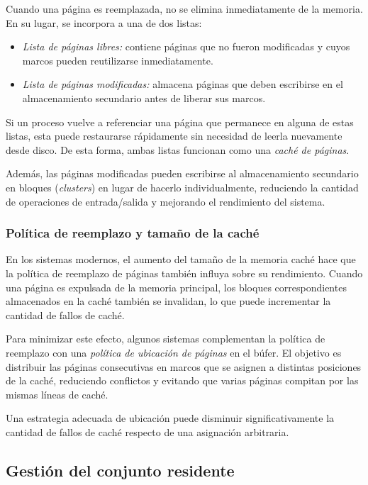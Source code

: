 Cuando una página es reemplazada, no se elimina inmediatamente de la memoria. En su lugar, se incorpora a una de dos listas:

\begin{itemize}
  \item \textit{Lista de páginas libres:} contiene páginas que no fueron modificadas y cuyos marcos pueden reutilizarse inmediatamente.
  \item \textit{Lista de páginas modificadas:} almacena páginas que deben escribirse en el almacenamiento secundario antes de liberar sus marcos.
\end{itemize}

Si un proceso vuelve a referenciar una página que permanece en alguna de estas listas, esta puede restaurarse rápidamente sin necesidad de leerla nuevamente desde disco. De esta forma, ambas listas funcionan como una \textit{caché de páginas}.

Además, las páginas modificadas pueden escribirse al almacenamiento secundario en bloques (\textit{clusters}) en lugar de hacerlo individualmente, reduciendo la cantidad de operaciones de entrada/salida y mejorando el rendimiento del sistema.

\subsubsection{Política de reemplazo y tamaño de la caché}

En los sistemas modernos, el aumento del tamaño de la memoria caché hace que la política de reemplazo de páginas también influya sobre su rendimiento. Cuando una página es expulsada de la memoria principal, los bloques correspondientes almacenados en la caché también se invalidan, lo que puede incrementar la cantidad de fallos de caché.

Para minimizar este efecto, algunos sistemas complementan la política de reemplazo con una \textit{política de ubicación de páginas} en el búfer. El objetivo es distribuir las páginas consecutivas en marcos que se asignen a distintas posiciones de la caché, reduciendo conflictos y evitando que varias páginas compitan por las mismas líneas de caché.

Una estrategia adecuada de ubicación puede disminuir significativamente la cantidad de fallos de caché respecto de una asignación arbitraria.

\subsection{Gestión del conjunto residente}

